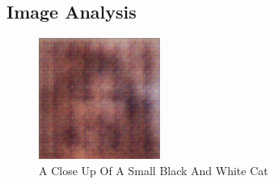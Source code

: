 \documentclass{article}%
\begin{document}
%
\subsection{Image Analysis}%
\label{subsec:ImageAnalysis}%


\begin{figure}[h!]%
\centering%
\includegraphics[width=150px]{500_fake_images/samples_5_497.png}%
\caption{A Close Up Of A Small Black And White Cat}%
\end{figure}

%
\end{document}
